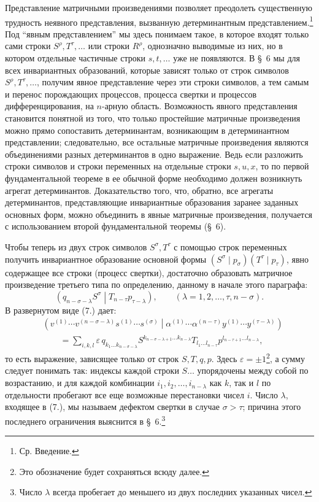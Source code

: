 \documentclass[11pt]{article}
\newcommand{\pair}[2]{\left(#1\middle|#2\right)}
\newcommand{\eps}{\varepsilon}
\begin{document}
Представление матричными произведениями позволяет преодолеть существенную трудность неявного представления, вызванную детерминантным представлением.\footnote{Ср. Введение.} Под ``явным представлением'' мы здесь понимаем такое, в которое входят только сами строки $S^\rho,T^\tau,\ldots$ или строки $R^\rho$, однозначно выводимые из них, но в котором отдельные частичные строки $s,t,\ldots$ уже не появляются. В \S\ 6 мы для всех инвариантных образований, которые зависят только от строк символов $S^\rho,T^\tau,\ldots$, получим явное представление через эти строки символов, а тем самым и перенос порождающих процессов, процесса свертки и процессов дифференцирования, на $n$-арную область. Возможность явного представления становится понятной из того, что только простейшие матричные произведения можно прямо сопоставить детерминантам, возникающим в детерминантном представлении; следовательно, все остальные матричные произведения являются объединениями разных детерминантов в одно выражение. Ведь если разложить строки символов и строки переменных на отдельные строки $s,u,x$, то по первой фундаментальной теореме в ее обычной форме необходимо должен возникнуть агрегат детерминантов. Доказательство того, что, обратно, все агрегаты детерминантов, представляющие инвариантные образования заранее заданных основных форм, можно объединить в явные матричные произведения, получается с использованием второй фундаментальной теоремы (\S\ 6).

Чтобы теперь из двух строк символов $S^\sigma,T^\tau$ с помощью строк переменных получить инвариантное образование основной формы $(S^\sigma\mid p_\sigma)(T^\tau\mid p_\tau)$, явно содержащее все строки (процесс свертки), достаточно образовать матричное произведение третьего типа по определению, данному в начале этого параграфа:
\begin{equation}
 \pair{q_{n-\sigma-\lambda}S^\sigma}{T_{n-\tau}p_{\tau-\lambda}},
 \qquad (\lambda=1,2,\ldots,\tau,n-\sigma).
\tag{7}
\end{equation}
В развернутом виде (7.) дает:
\begin{equation}
\begin{aligned}
&\pair{v^{(1)}\cdots v^{(n-\sigma-\lambda)}s^{(1)}\cdots s^{(\sigma)}}
       {\alpha^{(1)}\cdots\alpha^{(n-\tau)}y^{(1)}\cdots y^{(\tau-\lambda)}} \\
&\qquad =\sum_{i,k,l}\eps\,q_{k_1\ldots k_{n-\sigma-\lambda}}
 S^{k_{n-\sigma-\lambda+1}\ldots k_{n-\lambda}}
 T_{l_1\ldots l_{n-\tau}}
 p^{l_{n-\tau+1}\ldots l_{n-\lambda}},
\end{aligned}
\tag{8}
\end{equation}
то есть выражение, зависящее только от строк $S,T,q,p$. Здесь $\eps=\pm1$\footnote{Это обозначение будет сохраняться всюду далее.}, а сумму следует понимать так: индексы каждой строки $S\ldots$ упорядочены между собой по возрастанию, и для каждой комбинации $i_1,i_2,\ldots,i_{n-\lambda}$ как $k$, так и $l$ по отдельности пробегают все еще возможные перестановки чисел $i$. Число $\lambda$, входящее в (7.), мы называем дефектом свертки в случае $\sigma>\tau$; причина этого последнего ограничения выяснится в \S\ 6.\footnote{Число $\lambda$ всегда пробегает до меньшего из двух последних указанных чисел.}
\end{document}
